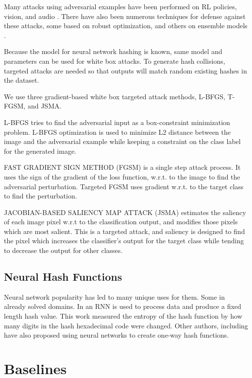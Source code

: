 \documentclass{article}
\begin{document}
Many attacks using adversarial examples have been performed on RL policies, vision,
and audio \cite{policy,intriguing,audio}. There have also been numerous techniques
for defense against these attacks, some based on robust optimization, and others
on ensemble models \cite{robust,ensemble}.

Because the model for neural network hashing is known, same model and parameters can be used for white box attacks. To generate hash collisions, targeted attacks are needed so that outputs will match random existing hashes in the dataset. 

We use three gradient-based white box targeted attack methods, L-BFGS, T-FGSM, and JSMA.

L-BFGS
tries to find the adversarial input as a box-constraint minimization problem. L-BFGS optimization is used to minimize L2 distance between the image and the adversarial example while keeping a constraint on the class label for the generated image.

FAST GRADIENT SIGN METHOD (FGSM)
is a single step attack process. It uses the sign of the gradient of the loss function, w.r.t. to the image to find the adversarial perturbation. 
Targeted FGSM uses gradient w.r.t. to the target class to find the perturbation.
	
JACOBIAN-BASED SALIENCY MAP ATTACK (JSMA)
estimates the saliency of each image pixel w.r.t to the classification output, and modifies those pixels which are most salient. This is a targeted attack, and saliency is designed to find the pixel which increases the classifier’s output for the target class while tending to decrease the output for other classes.


\subsection{Neural Hash Functions}

Neural network popularity has led to many unique uses for them. Some in already
solved domains. In \cite{hash1} an RNN is used to process data and produce
a fixed length hash value. This work measured the entropy of the hash function
by how many digits in the hash hexadecimal code were changed. Other authors,
including \cite{hash2} have also proposed using neural networks to create
one-way hash functions.

\section{Baselines}
\end{document}

